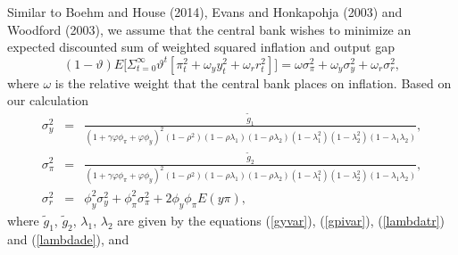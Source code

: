 \def\CTeXPreproc{Created by ctex v0.2.5, don't edit!}\documentclass[12pt]{article}
\numberwithin{equation}{section}
\begin{document}
Similar to Boehm and House (2014), Evans and Honkapohja (2003) and Woodford (2003), we assume that the central bank wishes to minimize an expected discounted sum of weighted squared inflation and output gap
\begin{equation}
(1-\vartheta)E\Big[\Sigma_{t=0}^\infty \vartheta^t[\pi_t^2+\omega_yy_t^2+\omega_r r_t^2] \Big]=\omega\sigma_\pi^2+\omega_y\sigma_y^2+\omega_r\sigma_r^2,\label{varobj}
\end{equation}
where $\omega$ is the relative weight that the central bank places on inflation. %
Based on our calculation
\begin{eqnarray}
\sigma_y^2&=&\frac{\widetilde{g}_1}{(1+\gamma\varphi\phi_\pi+\varphi\phi_y)^2(1-\rho^2)(1-\rho\lambda_1)(1-\rho\lambda_2)(1-\lambda_1^2)(1-\lambda_2^2)(1-\lambda_1\lambda_2)}, \label{varyc}\\
\sigma_\pi^2&=&\frac{\widetilde{g}_2}{(1+\gamma\varphi\phi_\pi+\varphi\phi_y)^2(1-\rho^2)(1-\rho\lambda_1)(1-\rho\lambda_2)(1-\lambda_1^2)(1-\lambda_2^2)(1-\lambda_1\lambda_2)}, \label{varpic}\\
\sigma_r^2&=&\phi_y^2\sigma_y^2+\phi_\pi^2\sigma_\pi^2+2\phi_y\phi_\pi E(y\pi),\label{varrc}
\end{eqnarray}
where $\widetilde{g}_1$, $\widetilde{g}_2$, $\lambda_1$, $\lambda_2$ are given by the equations (\ref{gyvar}), (\ref{gpivar}), (\ref{lambdatr}) and (\ref{lambdade}), and
\end{document}
